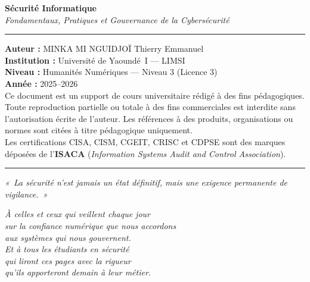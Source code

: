 \documentclass[12pt, a4paper, twoside, openright]{book}
\begin{document}
\begin{center}
    \begin{minipage}{0.78\textwidth}
        \footnotesize\color{CouleurBordInfo}
        \begin{center}
            {\bfseries\color{CouleurPrimaire}
                Sécurité Informatique}\\[0.4ex]
            {\itshape Fondamentaux, Pratiques et Gouvernance de la Cybersécurité}
        \end{center}
        \vspace{0.8ex}
        \hrule
        \vspace{0.8ex}
        \textbf{Auteur :} MINKA MI NGUIDJOÏ Thierry Emmanuel\\
        \textbf{Institution :} Université de Yaoundé~I — LIMSI\\
        \textbf{Niveau :} Humanités Numériques — Niveau 3 (Licence 3)\\
        \textbf{Année :} 2025--2026\\[0.5ex]
        Ce document est un support de cours universitaire rédigé à des fins
        pédagogiques. Toute reproduction partielle ou totale à des fins commerciales
        est interdite sans l'autorisation écrite de l'auteur. Les références à des
        produits, organisations ou normes sont citées à titre pédagogique uniquement.\\[0.5ex]
        Les certifications CISA, CISM, CGEIT, CRISC et CDPSE sont des marques
        déposées de l'\textbf{ISACA} (\textit{Information Systems Audit and Control Association}).\\[0.5ex]
        
        \hrule
        \vspace{0.5ex}
        {\centering\itshape
        «~La sécurité n'est jamais un état définitif, mais une exigence permanente de vigilance.~»}
    \end{minipage}
\end{center}

\vspace*{\fill}

\clearpage
\thispagestyle{empty}
\vspace*{3cm}
\begin{flushright}
    \begin{minipage}{0.6\textwidth}
        \itshape\large\color{CouleurPrimaire}
        À celles et ceux qui veillent chaque jour\\
        sur la confiance numérique que nous accordons\\
        aux systèmes qui nous gouvernent.\\[1.5ex]
        \normalsize\normalfont\color{CouleurAccent}
        Et à tous les étudiants en sécurité\\
        qui liront ces pages avec la rigueur\\
        qu'ils apporteront demain à leur métier.
    \end{minipage}
\end{flushright}
\end{document}

